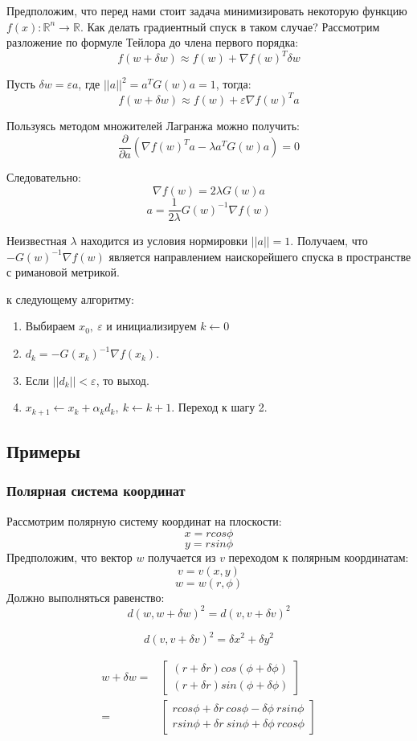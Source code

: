\documentclass[a4paper,12pt]{article}
\begin{document}
Предположим, что перед нами стоит задача минимизировать некоторую функцию $f(x) : \mathbb{R}^{n} \rightarrow \mathbb{R}$.
Как делать градиентный спуск в таком случае?
Рассмотрим разложение по формуле Тейлора до члена первого порядка:
$$f(w + \delta w) \approx f(w) + \nabla{f(w)}^T {\delta w}$$

Пусть $\delta w = \varepsilon a$, где $||a||^2 = a^TG(w)a = 1$, тогда:
$$f(w + \delta w) \approx f(w) + \varepsilon \nabla{f(w)}^T a$$

Пользуясь методом множителей Лагранжа можно получить:
$$\frac{\partial}{\partial a} (\nabla{f(w)}^Ta - \lambda a^TG(w)a) = 0$$

\newpage
Следовательно:
$$\nabla{f(w)} = 2\lambda G(w)a$$
$$a = \frac{1}{2 \lambda} G(w)^{-1}\nabla{f(w)}$$

Неизвестная $\lambda$ находится из условия нормировки $||a|| = 1$.
Получаем, что $-G(w)^{-1}\nabla{f(w)}$ является направлением наискорейшего спуска в пространстве с римановой метрикой.

 к следующему алгоритму:
\begin{enumerate}
    \item Выбираем $x_0, ~ \varepsilon $ и инициализируем $k \leftarrow 0$
    \item $d_k = -G(x_k)^{-1}\nabla{f(x_k)}$.
    \item Если $||d_k|| < \varepsilon$, то выход.
    \item $x_{k+1} \leftarrow x_{k} + \alpha_k d_k, ~ k \leftarrow k + 1$. Переход к шагу 2. 
\end{enumerate}

\newpage

\subsection{Примеры}
\subsubsection{Полярная система координат}
Рассмотрим полярную систему координат на плоскости:
$$ x = r cos \phi $$
$$ y = r sin \phi $$
Предположим, что вектор $w$ получается из $v$ переходом к полярным координатам:
$$ v = v(x, y) $$
$$ w = w(r, \phi) $$
Должно выполняться равенство:
$$d(w, w + \delta w)^2 = d(v, v + \delta v)^2$$

$$d(v, v + \delta v)^2 = {\delta x}^2 + {\delta y}^2$$

$$
\begin{aligned}
w + \delta w  
    = & \begin{bmatrix} 
        (r + \delta r) cos (\phi + \delta \phi) \\
        (r + \delta r) sin (\phi + \delta \phi) 
    \end{bmatrix} \\
    =   & \begin{bmatrix}
        r cos \phi + \delta r ~ cos \phi - \delta \phi ~ r sin \phi \\
        r sin \phi + \delta r ~ sin \phi + \delta \phi ~ r cos \phi
    \end{bmatrix}
\end{aligned}
$$
\end{document}
